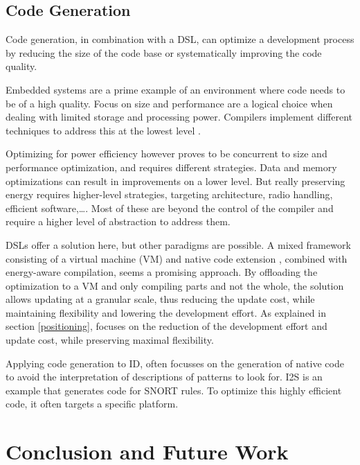 \documentclass[conference]{IEEEtran}
\begin{document}
\subsection{Code Generation}

Code generation, in combination with a DSL, can optimize a development process
by reducing the size of the code base or systematically improving the code
quality.

Embedded systems are a prime example of an environment where code needs to be
of a high quality. Focus on size and performance are a logical choice when
dealing with limited storage and processing power. Compilers implement
different techniques to address this at the lowest level
\cite{marwedel2002code}.

Optimizing for power efficiency however proves to be concurrent to size and
performance optimization, and requires different strategies. Data and memory
optimizations \cite{panda2001data} can result in improvements on a lower level.
But really preserving energy requires higher-level strategies, targeting
architecture, radio handling, efficient software,\dots \cite{naik2001software}.
Most of these are beyond the control of the compiler and require a higher level
of abstraction to address them.

DSLs offer a solution here, but other paradigms are possible. A mixed framework
consisting of a virtual machine (VM) and native code extension
\cite{sadilek2007energy}, combined with energy-aware compilation, seems a
promising approach. By offloading the optimization to a VM and only compiling
parts and not the whole, the solution allows updating at a granular scale, thus
reducing the update cost, while maintaining flexibility and lowering the
development effort. As explained in section \ref{positioning}, \NAME focuses on
the reduction of the development effort and update cost, while preserving
maximal flexibility.

Applying code generation to ID, often focusses on the generation of native code
to avoid the interpretation of descriptions of patterns to look for. I2S
\cite{charitakis2003code} is an example that generates code for SNORT
\cite{roesch1999snort} rules. To optimize this highly efficient code, it often
targets a specific platform.

\section{Conclusion and Future Work}
\label{conclusion}
\end{document}
